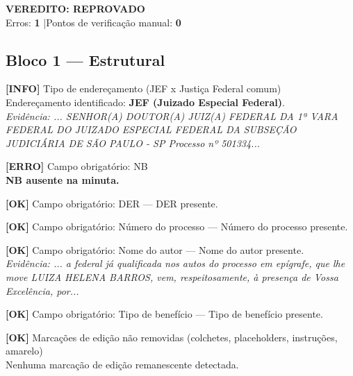 \documentclass[12pt,a4paper]{article}
\newcommand{\statusOK}[1]{\textcolor{corOK}{\textbf{[OK]}} #1}
\newcommand{\statusERRO}[1]{\textcolor{corERRO}{\textbf{[ERRO]}} #1}
\newcommand{\statusINFO}[1]{\textcolor{corINFO}{\textbf{[INFO]}} #1}
\begin{document}
\vspace{0.5em}

\noindent\colorbox{corFundoReprovado}{%
  \begin{minipage}{\dimexpr\linewidth-2\fboxsep}
    \centering
    \vspace{0.3em}
    {\large \textcolor{corERRO}{\textbf{VEREDITO: REPROVADO}}}\\
    Erros: \textbf{1} \quad|\quad Pontos de verificação manual: \textbf{0}
    \vspace{0.3em}
  \end{minipage}%
}

\vspace{1em}


\subsection{Bloco 1 --- Estrutural}

\statusINFO{Tipo de endereçamento (JEF x Justiça Federal comum)}\\
Endereçamento identificado: \textbf{JEF (Juizado Especial Federal)}.\\
\textit{Evidência: ... SENHOR(A) DOUTOR(A) JUIZ(A) FEDERAL DA 1ª VARA FEDERAL DO JUIZADO ESPECIAL FEDERAL DA SUBSEÇÃO JUDICIÁRIA DE SÃO PAULO - SP Processo nº 501334...}

\medskip
\statusERRO{Campo obrigatório: NB}\\
\textbf{NB ausente na minuta.}

\medskip
\statusOK{Campo obrigatório: DER} --- DER presente.

\medskip
\statusOK{Campo obrigatório: Número do processo} --- Número do processo presente.

\medskip
\statusOK{Campo obrigatório: Nome do autor} --- Nome do autor presente.\\
\textit{Evidência: ... a federal já qualificada nos autos do processo em epígrafe, que lhe move LUIZA HELENA BARROS, vem, respeitosamente, à presença de Vossa Excelência, por...}

\medskip
\statusOK{Campo obrigatório: Tipo de benefício} --- Tipo de benefício presente.

\medskip
\statusOK{Marcações de edição não removidas (colchetes, placeholders, instruções, amarelo)}\\
Nenhuma marcação de edição remanescente detectada.
\end{document}
